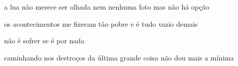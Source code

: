 \begin{poem}
\begin{stanza}
a lua não merece ser olhada\verseline
nem nenhuma foto\verseline
mas não há opção
\end{stanza}
\begin{stanza}
os acontecimentos me fizeram\verseline
tão pobre e é tudo\verseline
vazio demais
\end{stanza}
\begin{stanza}
não é sofrer se é por nada
\end{stanza}
\begin{stanza}
caminhando nos destroços\verseline
da última grande coisa\verseline
não dou mais a mínima 
\end{stanza}
\end{poem}